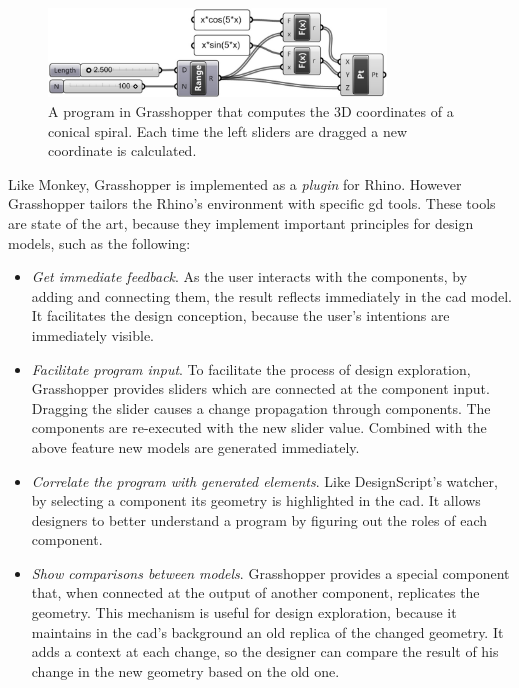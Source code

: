 \begin{figure}[!htbp]
\vspace{-5pt}
  \centering
  \includegraphics[width=0.8\textwidth]{img/grasshopper}
  \vspace{-5pt}
    \caption{A program in Grasshopper that computes the 3D coordinates of a conical spiral. Each time the left sliders are dragged a new coordinate is calculated.}
  \label{fig:grass}
  \vspace{-10pt}
\end{figure}

Like Monkey, Grasshopper is implemented as a \textit{plugin} for Rhino\footnotemark[\ref{rhin}]. However Grasshopper tailors the Rhino's environment with specific \ac{gd} tools. These tools are state of the art, because they implement important principles for design models, such as the following:

\begin{itemize}
 \item \textit{Get immediate feedback}. As the user interacts with the components, by adding and connecting them, the result reflects immediately in the \ac{cad} model. It facilitates the design conception, because the user's intentions are immediately visible. 
 \item \textit{Facilitate program input}. To facilitate the process of design exploration, Grasshopper provides sliders which are connected at the component input. Dragging the slider causes a change propagation through components. The components are re-executed with the new slider value. Combined with the above feature new models are generated immediately.
 \item \textit{Correlate the program with generated elements}. Like DesignScript's watcher, by selecting a component its geometry is highlighted in the \ac{cad}. It allows designers to better understand a program by figuring out the roles of each component.
 \item \textit{Show comparisons between models}. Grasshopper provides a special component that, when connected at the output of another component, replicates the geometry. This mechanism is useful for design exploration, because it maintains in the \ac{cad}'s background an old replica of the changed geometry. It adds a context at each change, so the designer can compare the result of his change in the new geometry based on the old one.
\end{itemize}

